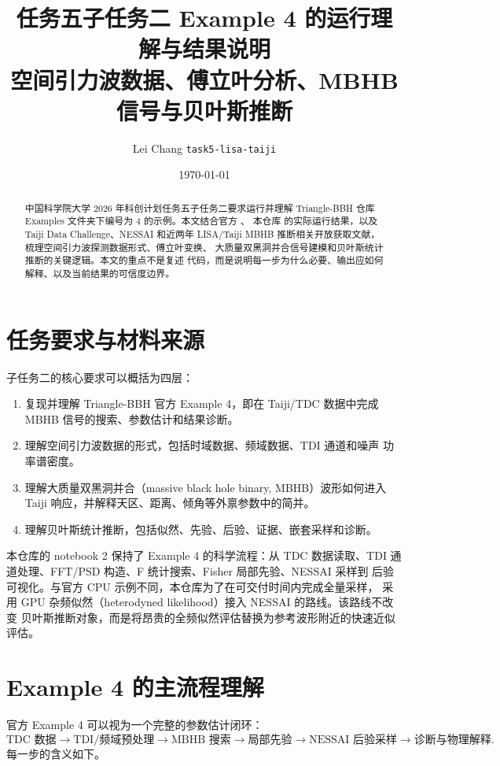 \documentclass[11pt,a4paper]{ctexart}
\title{\bfseries 任务五子任务二 Example 4 的运行理解与结果说明\\
\large 空间引力波数据、傅立叶分析、MBHB 信号与贝叶斯推断}
\author{Lei Chang \quad \texttt{task5-lisa-taiji}}
\date{\today}
\begin{document}
\maketitle

\begin{abstract}
中国科学院大学 2026 年科创计划任务五子任务二要求运行并理解
Triangle-BBH 仓库 Examples 文件夹下编号为 4 的示例。本文结合官方
、
本仓库 
的实际运行结果，以及 Taiji Data Challenge、NESSAI 和近两年 LISA/Taiji
MBHB 推断相关开放获取文献，梳理空间引力波探测数据形式、傅立叶变换、
大质量双黑洞并合信号建模和贝叶斯统计推断的关键逻辑。本文的重点不是复述
代码，而是说明每一步为什么必要、输出应如何解释、以及当前结果的可信度边界。
\end{abstract}

\section{任务要求与材料来源}

子任务二的核心要求可以概括为四层：
\begin{enumerate}
  \item 复现并理解 Triangle-BBH 官方 Example 4，即在 Taiji/TDC 数据中完成
  MBHB 信号的搜索、参数估计和结果诊断。
  \item 理解空间引力波数据的形式，包括时域数据、频域数据、TDI 通道和噪声
  功率谱密度。
  \item 理解大质量双黑洞并合（massive black hole binary, MBHB）波形如何进入
  Taiji 响应，并解释天区、距离、倾角等外禀参数中的简并。
  \item 理解贝叶斯统计推断，包括似然、先验、后验、证据、嵌套采样和诊断。
\end{enumerate}

本仓库的 notebook 2 保持了 Example 4 的科学流程：从 TDC 数据读取、TDI
通道处理、FFT/PSD 构造、F 统计搜索、Fisher 局部先验、NESSAI 采样到
后验可视化。与官方 CPU 示例不同，本仓库为了在可交付时间内完成全量采样，
采用 GPU 杂频似然（heterodyned likelihood）接入 NESSAI 的路线。该路线不改变
贝叶斯推断对象，而是将昂贵的全频似然评估替换为参考波形附近的快速近似评估。

\section{Example 4 的主流程理解}

官方 Example 4 可以视为一个完整的参数估计闭环：
\[
  \text{TDC 数据} \rightarrow
  \text{TDI/频域预处理} \rightarrow
  \text{MBHB 搜索} \rightarrow
  \text{局部先验} \rightarrow
  \text{NESSAI 后验采样} \rightarrow
  \text{诊断与物理解释}.
\]
每一步的含义如下。
\end{document}
